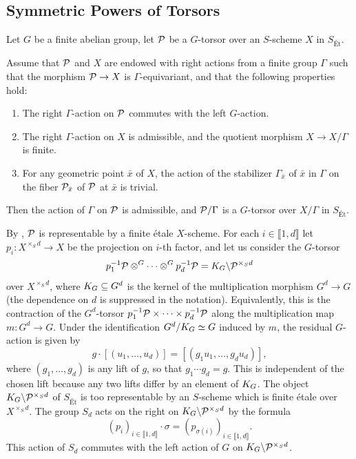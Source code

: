\subsection*{Symmetric Powers of Torsors}
Let $G$ be a finite abelian group, let $\mathcal{P}$ be a $G$-torsor over an $S$-scheme $X$ in $S_{\text{Ét}}$. 


\begin{prop}
Assume that $\mathcal{P}$ and $X$ are endowed with right actions from a finite group $\Gamma$ 
such that the morphism $\mathcal{P} \to X$ is $\Gamma$-equivariant, and that the following properties hold:
\begin{enumerate}
    \item[(a)] The right $\Gamma$-action on $\mathcal{P}$ commutes with the left $G$-action.
    \item[(b)] The right $\Gamma$-action on $X$ is admissible, and the quotient morphism $X \to X/\Gamma$ is finite.
    \item[(c)] For any geometric point $\bar{x}$ of $X$, the action of the stabilizer $\Gamma_{\bar{x}}$ of $\bar{x}$ in $\Gamma$ on the fiber $\mathcal{P}_{\bar{x}}$ of $\mathcal{P}$ at $\bar{x}$ is trivial.
\end{enumerate}
Then the action of $\Gamma$ on $\mathcal{P}$ is admissible, and $\mathcal{P}/\Gamma$ is a $G$-torsor over $X/\Gamma$ in $S_{\text{Ét}}$.
\end{prop}

By , $\mathcal{P}$ is representable by a finite étale $X$-scheme.
For each $i \in  \llbracket 1, d \rrbracket$ let $p_i : X^{\times_S d} \to X$ be the projection on $i$-th factor, and let us consider the $G$-torsor
\[
p_1^{-1}\mathcal{P} \otimes^G \cdots \otimes^G p_d^{-1}\mathcal{P} = K_{G} \backslash \mathcal{P}^{\times_S d}
\]
over $X^{\times_S d}$, where $K_{G} \subseteq G^d$ is the kernel of the multiplication morphism $G^d \to G$ (the dependence on $d$ is suppressed in the notation).
Equivalently, this is the contraction of the $G^d$-torsor
$p_1^{-1}\mathcal{P}\times\cdots\times p_d^{-1}\mathcal{P}$ along the multiplication map
$m:G^d\to G$.
Under the identification $G^d/K_{G}\simeq G$ induced by $m$, the residual
$G$-action is given by
\[
g\cdot[(u_1,\dots,u_d)]
    =[(g_1u_1,\dots,g_du_d)],
\]
where $(g_1,\dots,g_d)$ is any lift of $g$, so that
$g_1\cdots g_d=g$. This is independent of the chosen lift because any two
lifts differ by an element of $K_{G}$.
The object $K_{G} \backslash \mathcal{P}^{\times_S d}$ of $S_{\text{Ét}}$ is too representable by an $S$-scheme which is finite étale over $X^{\times_S d}$.
The group ${S}_d$ acts on the right on $K_{G} \backslash \mathcal{P}^{\times_S d}$ by the formula
\[
(p_i)_{i \in \llbracket 1, d \rrbracket} \cdot \sigma = (p_{\sigma(i)})_{i \in \llbracket 1, d \rrbracket}.
\]
This action of ${S}_d$ commutes with the left action of $G$ on $K_{G} \backslash \mathcal{P}^{\times_S d}$.


